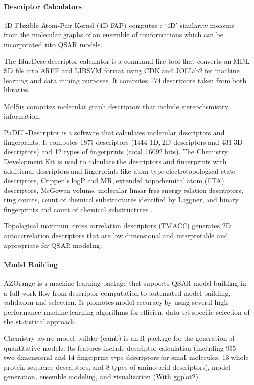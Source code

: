 \paragraph{Descriptor Calculators}
4D Flexible Atom-Pair Kernel (4D FAP) computes a `4D' similarity measure from the molecular graphs of an ensemble of conformations which can be incorporated into QSAR models.

The BlueDesc descriptor calculator is a command-line tool that converts an MDL SD file into ARFF and LIBSVM format using CDK and JOELib2 for machine learning and data mining purposes. It computes 174 descriptors taken from both libraries.

MolSig \cite{Carbonell_2013} computes molecular graph descriptors that include stereochemistry information.

PaDEL-Descriptor  \cite{Yap_2010} is a software that calculates molecular descriptors and fingerprints. It computes 1875 descriptors (1444 1D, 2D descriptors and 431 3D descriptors) and 12 types of fingerprints (total 16092 bits). The Chemistry Development Kit is used to calculate the descriptors and fingerprints with additional descriptors and fingerprints like atom type electrotopological state descriptors, Crippen's logP and MR, extended topochemical atom (ETA) descriptors, McGowan volume, molecular linear free energy relation descriptors, ring counts, count of chemical substructures identified by Laggner, and binary fingerprints and count of chemical substructures \cite{Yap_2010}.

Topological maximum cross correlation descriptors (TMACC) \cite{Melville_2007} generates 2D autocorrelation descriptors that are low dimensional and interpretable and appropriate for QSAR modeling.

\paragraph{Model Building}
AZOrange \cite{St_lring_2011} is a machine learning package that supports QSAR model building in a full work flow from descriptor computation to automated model building, validation and selection. It promotes model accuracy by using several high performance machine learning algorithms for efficient data set specific selection of the statistical approach.

Chemistry aware model builder (camb) \cite{Murrell_2015} is an R package for the generation of quantitative models. Its features include descriptor calculation (including 905 two-dimensional and 14 fingerprint type descriptors for small molecules, 13 whole protein sequence descriptors, and 8 types of amino acid descriptors), model generation, ensemble modeling, and visualization (With ggplot2).

